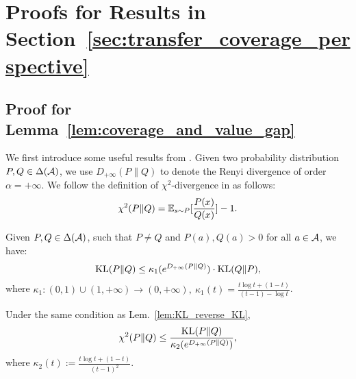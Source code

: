 \section{Proofs for Results in Section~\ref{sec:transfer_coverage_perspective}}\label{appx:coverage_related}
\subsection{Proof for Lemma~\ref{lem:coverage_and_value_gap}}
We first introduce some useful results from \citep{sason2016f}. Given two probability distribution $P, Q \in \Delta(\mathcal{A})$, we use $D_{+\infty}(P\|Q)$ to denote the Renyi divergence of order $\alpha = +\infty$. 
We follow the definition of $\chi^2$-divergence in \citep{sason2016f} as follows:
\begin{align*}
    \chi^2(P\|Q) = \mathbb{E}_{s\sim P}[\frac{P(x)}{Q(x)}] - 1.
\end{align*}
%
\begin{lemma}\label{lem:KL_reverse_KL}
    Given $P,Q\in\Delta(\mathcal{A})$, such that $P\neq Q$ and $P(a),Q(a) > 0$ for all $a\in\mathcal{A}$, we have:
    \begin{align*}
        \text{KL}(P\|Q) \leq \kappa_1(e^{D_{+\infty}(P\|Q)}) \cdot \text{KL}(Q\|P),
    \end{align*}
    where $\kappa_1:(0,1)\cup(1,+\infty) \rightarrow (0,+\infty),~\kappa_1(t) = \frac{t\log t + (1-t)}{(t-1) - \log t}$.
\end{lemma}
\begin{lemma}[Eq. 182; Theorem 9 in \citep{sason2016f} for $\alpha= 2$]\label{lem:chi_KL}
    Under the same condition as Lem.~\ref{lem:KL_reverse_KL}, 
    \begin{align*}
        \chi^2(P\|Q) \leq \frac{\text{KL}(P\|Q)}{\kappa_2(e^{D_{+\infty}(P\|Q)})},
    \end{align*}
    where $\kappa_2(t) := \frac{t\log t + (1-t)}{(t-1)^2}$.
\end{lemma}


%
%
%
%
%
%
%
%
%
%
%
%
%
%
%
%
%
%
%

%
%
%
%
%
%


